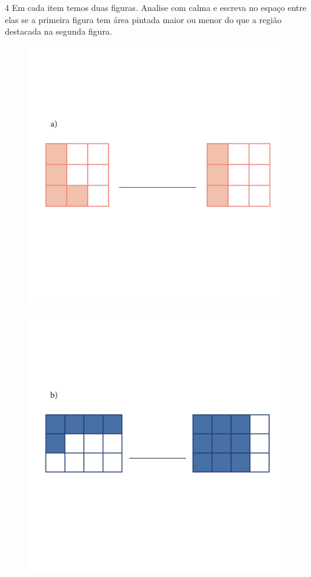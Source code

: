 \num{4} Em cada item temos duas figuras. Analise com calma e escreva no
espaço entre elas se a primeira figura tem área pintada maior ou menor
do que a região destacada na segunda figura.

\begin{figure}[htpb!]
\includegraphics[width=\textwidth]{../ilustracoes/MAT5/SAEB_5ANO_MAT_figura69-1.png}
\end{figure}

\begin{figure}[htpb!]
\includegraphics[width=\textwidth]{../ilustracoes/MAT5/SAEB_5ANO_MAT_figura69-2.png}
\end{figure}


